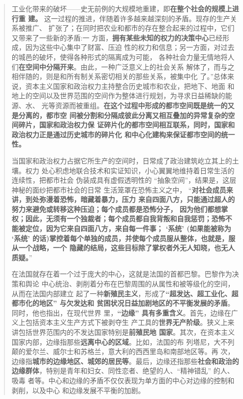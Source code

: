 \begin{quotation}
  工业化带来的破坏——史无前例的大规模地重建，即\textbf{在整个社会的规模上进行重
    建。} 这一过程的推进，伴随着许多越来越深刻的矛盾。现存的生产关系被推广、
  扩张了；在同时把农业和都市的存在整合起来的过程中，它们又带来了一些新的矛盾:一
  方面，\textbf{拥有某些未知的权力的决策中心}已经形成，因为这些中心集中了财富、压迫
  性的权力和信息；另一方面，对过去的城邑的破坏，使得各种形式的隔离成为可能，
  各种社会力量无情地将人们\textbf{在空间中分隔开来}。由此，一种广泛意义上的社会关系
  解体了，而与之相伴随的，则是和所有制关系密切相关的那些关系，被集中化
  了。”总体来说，资本主义国家和政治权力主持整合历史城市和农业，把地下、地面
  和地上的空间以及世界范围的空间作为整体进行规划，为寻求日益稀缺的能源、水、
  光等资源而被重组。\textbf{在这个过程中形成的都市空间既是统一的又是分离的，都市空
    间被分割和分隔成彼此分离又相互叠加的异常复杂的空间碎片，国家和政治权力保
    证碎片化的都市空间相互联系，同时，国家和政治权力正是通过历史城市的碎片化
    和中心化建构来保证都市空间的统一性。}

  当国家和政治权力占据它所生产的空间时，日常成了政治建筑屹立其上的土壤。权力
  处心积虑地联合技术和实证知识，小心翼翼地维持着日常生活的连续性，把都市社会
  伪装成具有虚假透明性的 “抽象空间”，结果是，这层神秘的面纱把都市社会的日常
  生活笼罩在恐怖主义之中， “\textbf{对社会成员来讲，到处弥漫着恐怖，暗藏着暴力，压力
    来自四面八方，只能通过超人的努力来避免或转移这种压迫；每个成员都是恐怖分子，
    因为他们都想掌权；因此，无须有一个独裁者；每个成员都自我背叛和自我惩罚；恐怖不
    能被定位，因为它来自四面八方，来自每一件事； ‘系统’ (如果能被称为 ‘系统’
    的话)掌控着每个单独的成员，并使每个成员服从整体，也就是，服从一个战略，一个
    隐藏的结局，这些目标除了掌权者外无人知晓，也无人质疑。}”

  在法国就存在着一个过于庞大的中心，这就是法国的首都巴黎。巴黎作为决策和舆论
  中心统治、剥削着分布在巴黎周围的从属性和被等级化的空间，从而在法国内部建立
  起了一种\textbf{新殖民主义}，形成了\textbf{“超发达、超工业化、超都市化的地区” 与欠发达和
    贫困状况日益加剧地区的不平衡发展的矛盾}。同时，他也指出，在现代世界
  里，\textbf{“边缘” 具有多重含义}。首先，边缘在广义上包括资本主义生产方式下被剥夺生
  产工具的\textbf{世界无产阶级}。狭义上来讲包括世界范围内的不发达国家特别是\textbf{前殖民地
  国家}。其次，在资本主义国家内部，边缘指那些\textbf{远离中心的区域}。比如，法国的布
  列塔尼，大不列颠的爱尔兰、威尔士和苏格兰，意大利的西西里岛和南部地区等。再
  次，边缘指\textbf{城市的边缘地区、城郊的居民等}。最后，边缘还指那些\textbf{社会和政治的
    边缘群体}，特别是青年和妇女、同性恋者、绝望的人、“精神错乱” 的人、吸毒
  者等。中心和边缘的矛盾不仅仅表现为单方面的中心对边缘的控制和剥削，以及中心
  和边缘发展不平衡的加剧。


\end{quotation}
